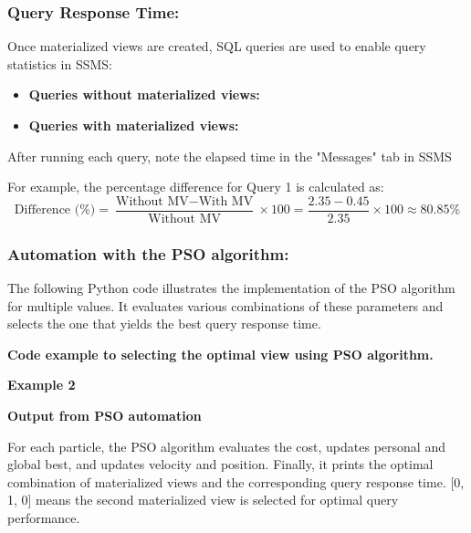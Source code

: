   
  
  
\subsubsection{Query Response Time:} Once materialized views are created, SQL queries are used to enable query statistics in SSMS:

   

\begin{itemize}
    \item \textbf{Queries without materialized views:}
    \item \textbf{Queries with materialized views:}
\end{itemize}

After running each query, note the elapsed time in the "Messages" tab in SSMS
   

For example, the percentage difference for Query 1 is calculated as:
\[
\text{Difference (\%)} = \frac{\text{Without MV} - \text{With MV}}{\text{Without MV}} \times 100 = \frac{2.35 - 0.45}{2.35} \times 100 \approx 80.85\%
\]


\subsubsection{Automation with the PSO algorithm:}
 The following Python code illustrates the implementation of the PSO algorithm for multiple values. It evaluates various combinations of these parameters and selects the one that yields the best query response time.\vspace{.4cm}
 


\textbf{Code example to selecting the optimal view using PSO algorithm.}

  \vspace{.4cm}

\textbf{Example 2}
  \vspace{.4cm}

  \textbf{Output from PSO automation } 

  
  


 For each particle, the PSO algorithm evaluates the cost, updates personal and global best, and updates velocity and position. Finally, it prints the optimal combination of materialized views and the corresponding query response time.
 [0, 1, 0] means the second materialized view is selected for optimal query performance.
  


